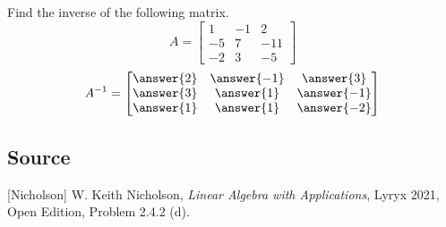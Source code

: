 \documentclass{ximera}
\author{}
\begin{document}
\begin{exercise}
Find the inverse of the following matrix.
$$A=\begin{bmatrix}1 & -1 & 2\\-5 & 7 & -11\\-2 & 3 &-5\end{bmatrix}$$
$$A^{-1}=\begin{bmatrix}\answer{2} & \answer{-1} & \answer{3}\\\answer{3} & \answer{1} & \answer{-1}\\\answer{1} & \answer{1} &\answer{-2}\end{bmatrix}$$
 
\end{exercise}

\subsection*{Source}
[Nicholson] W. Keith Nicholson, {\it Linear Algebra with Applications}, Lyryx 2021, Open Edition, Problem 2.4.2 (d).
\end{document}
